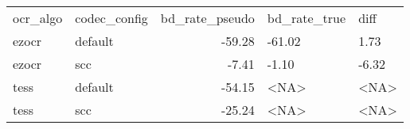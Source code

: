 \begin{tabular}{llrll}
ocr_algo & codec_config & bd_rate_pseudo & bd_rate_true & diff \\
ezocr & default & -59.28 & -61.02 & 1.73 \\
ezocr & scc & -7.41 & -1.10 & -6.32 \\
tess & default & -54.15 & <NA> & <NA> \\
tess & scc & -25.24 & <NA> & <NA> \\
\end{tabular}
